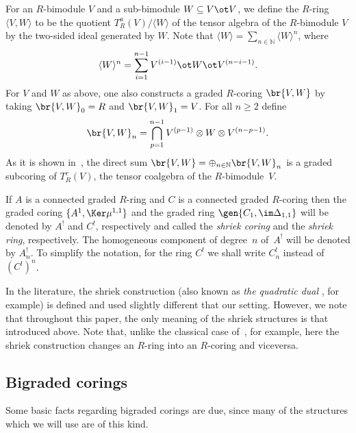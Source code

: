 For an $R$-bimodule $V$ and a sub-bimodule $W\subseteq V\ot V$, we def\/ine the $R$-ring $\langle V, W \rangle$ to be the quotient $T^a_R (V)/\langle W \rangle$ of the tensor algebra of the $R$-bimodule $V$ by the two-sided ideal generated by $W$. Note that $\langle W\rangle=\sum\limits_{n\in\mathbb{N}} \langle W\rangle^n$, where
 \begin{gather*}
 \langle W\rangle^n=\sum_{i=1}^{n-1}V^{(i-1)}\ot W\ot V^{ (n-i-1)}. \end{gather*}
For $V$ and $W$ as above, one also constructs a graded $R$-coring $\br{V,W}$ by taking $\br{V,W}_0=R$ and $\br{V,W}_1=V$. For all $n \geq 2$ def\/ine
\begin{gather*}
\br{V,W}_n=\bigcap_{p=1}^{n-1} V^{(p-1)} \otimes W \otimes V^{ (n-p-1)}.
\end{gather*}
As it is shown in~\cite{jps}, the direct sum $\br{V,W}=\oplus_{n \in \mathbb{N}} \br{V,W}_n$ is a graded subcoring of $T^c_R(V)$, the tensor coalgebra of the $R$-bimodule~$V$.

If $A$ is a connected graded $R$-ring and $C$ is a connected graded $R$-coring then the graded coring $\{A^1,\Ker\mu^{1,1}\}$ and the graded ring $\gen{C_1,\im\Delta_{1,1}}$ will be denoted by $A^!$ and $C^!$, respectively and called the \emph{shriek coring} and the \emph{shriek ring}, respectively. The homogeneous component of degree~$n$ of~$A^!$ will be denoted by $A^!_n$. To simplify the notation, for the ring $C^!$ we shall write $C^!_n$ instead of~$(C^!)^n$.

\begin{Remark} In the literature, the shriek construction (also known as \emph{the quadratic dual} \cite[Section~2.8]{bgs}, for example) is def\/ined and used slightly dif\/ferent that our setting. However, we note that throughout this paper, the only meaning of the shriek structures is that introduced above. Note that, unlike the classical case of~\cite{bgs}, for example, here the shriek construction changes an $R$-ring into an $R$-coring and viceversa. \end{Remark}

\subsection{Bigraded corings}
Some basic facts regarding bigraded corings are due, since many of the structures which we will use are of this kind.

